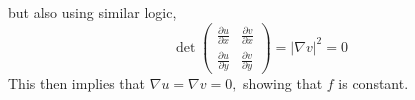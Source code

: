 \documentclass[11pt]{article}
\begin{document}
\begin{solution}
    but also using similar logic,
    \[\det \begin{pmatrix}
        \frac{\partial u}{\partial x} & \frac{\partial v}{\partial x}\\
        \frac{\partial u}{\partial y} & \frac{\partial v}{\partial y}
    \end{pmatrix}
    = |\nabla v|^2 = 0\]
This then implies that $\nabla u = \nabla v =0,$ showing that $f$ is constant.

\end{solution}

\newpage
\end{document}
